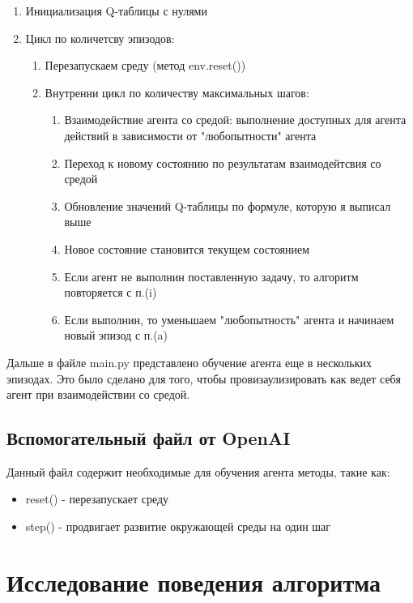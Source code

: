 \documentclass[12pt, a4paper]{report}
\theoremstyle{definition}
\theoremstyle{plain}
\theoremstyle{remark}
\theoremstyle{remark}
\theoremstyle{definition}
\begin{document}
\begin{enumerate}
    \item Инициализация Q-таблицы с нулями
    \item Цикл по количетсву эпизодов:
    \begin{enumerate}
        \item Перезапускаем среду (метод env.reset())
        \item Внутренни цикл по количеству максимальных шагов:
        \begin{enumerate}
            \item Взаимодействие агента со средой: выполнение доступных для агента действий в зависимости от "любопытности" агента
            \item Переход к новому состоянию по результатам взаимодейтсвия со средой
            \item Обновление значений Q-таблицы по формуле, которую я выписал выше
            \item Новое состояние становится текущем состоянием
            \item Если агент не выполнин поставленную задачу, то алгоритм повторяется с п.(i)
            \item Если выполнин, то уменьшаем "любопытность" агента и начинаем новый эпизод с п.(a)
        \end{enumerate}
    \end{enumerate}
\end{enumerate}

Дальше в файле main.py представлено обучение агента еще в нескольких эпизодах. Это было сделано для того, чтобы провизаулизировать как ведет себя агент при взаимодействии со средой.

\subsection{Вспомогательный файл от OpenAI}
Данный файл содержит необходимые для обучения агента методы, такие как:
\begin{itemize}
    \item reset() - перезапускает среду
    \item step() - продвигает развитие окружающей среды на один шаг
\end{itemize}

\section{Исследование поведения алгоритма}
\end{document}
